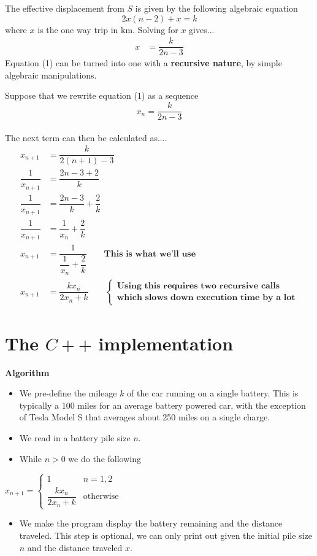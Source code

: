 \documentclass[a4paper, 12pt]{article}
\begin{document}
\begin{flushleft}
The effective displacement from $S$ is given by the following algebraic equation $$2x(n-2)+x=k$$ where $x$ is the one way trip in km. Solving for $x$ gives...
\begin{align}
x&=\dfrac{k}{2n-3}
\end{align}
Equation (1) can be turned into one with a \textbf{recursive nature}, by simple algebraic manipulations.

Suppose that we rewrite equation (1) as a sequence
$$x_n=\dfrac{k}{2n-3}$$\\
The next term can then be calculated as....\\
\begin{align*}
x_{n+1}&=\dfrac{k}{2(n+1)-3}\\\dfrac{1}{x_{n+1}}&=\dfrac{2n-3+2}{k}\\\dfrac{1}{x_{n+1}}&=\dfrac{2n-3}{k}+\dfrac{2}{k}\\\dfrac{1}{x_{n+1}}&=\dfrac{1}{x_n}+\dfrac{2}{k}\\x_{n+1}&=\dfrac{1}{\dfrac{1}{x_n}+\dfrac{2}{k}}\qquad\textbf{This is what we'll use}\\x_{n+1}&=\dfrac{kx_n}{2x_n+k}\qquad\begin{cases}\textbf{Using this requires two recursive calls}\\\textbf{which slows down execution time by a lot}\end{cases}
\end{align*}
\end{flushleft}

\section*{The $C++$ implementation}
\textbf{Algorithm}
\begin{itemize}
\item We pre-define the mileage $k$ of the car running on a single battery. This is typically a 100 miles for an average battery powered car, with the exception of Tesla Model S that averages about 250 miles on a single charge.
\item We read in a battery pile size $n$.
\item While $n>0$ we do the following
\end{itemize}
\begin{center}
$x_{n+1}=\begin{cases}1&n=1,2\\\dfrac{kx_n}{2x_n+k}&\text{otherwise}\end{cases}$
\end{center}
\begin{itemize}
\item We make the program display the battery remaining and the distance traveled. This step is optional, we can only print out given the initial pile size $n$ and the distance traveled $x$.
\end{itemize}
\end{document}
